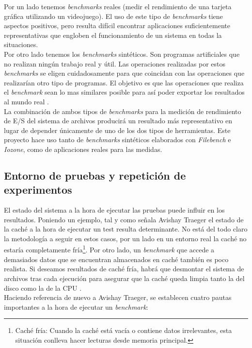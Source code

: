 Por un lado tenemos \textit{benchmarks} reales (medir el rendimiento de una tarjeta gráfica utilizando un videojuego). El uso de este tipo de \textit{benchmarks} tiene aspectos positivos, pero resulta difícil encontrar aplicaciones suficientemente representativas que engloben el funcionamiento de un sistema en todas la situaciones.\\

Por otro lado tenemos los \textit{benchmarks} sintéticos. Son programas artificiales que no realizan ningún trabajo real y útil. Las operaciones realizadas por estos \textit{benchmarks} se eligen cuidadosamente para que coincidan con las operaciones que realizarían otro tipo de programas. El objetivo es que las operaciones que realiza el \textit{benchmark} sean lo mas similares posible para así poder exportar los resultados al mundo real \cite{lilja_2000}.\\

La combinación de ambos tipos de \textit{benchmarks} para la medición de rendimiento de E/S del sistema de archivos producirá un resultado más representativo en lugar de depender únicamente de uno de los dos tipos de herramientas. Este proyecto hace uso tanto de \textit{benchmarks} sintéticos elaborados con \textit{Filebench} e \textit{Iozone}, como de aplicaciones reales para las medidas.

\subsection{Entorno de pruebas y repetición de experimentos}\label{numejecs}
El estado del sistema a la hora de ejecutar las pruebas puede influir en los resultados. Poniendo un ejemplo, tal y como señala Avishay Traeger \cite{traeger} el estado de la caché a la hora de ejecutar un test resulta determinante. No está del todo claro la metodología a seguir en estos casos, por un lado en un entorno real la caché no estaría completamente fría\footnote{Caché fría: Cuando la caché está vacía o contiene datos irrelevantes, esta situación conlleva hacer lecturas desde memoria principal.}. Por otro lado, un \textit{benchmark} que accede a demasiados datos que se encuentran almacenados en caché también es poco realista. Si deseamos resultados de caché fría, habrá que desmontar el sistema de archivos tras cada ejecución para asegurar que la caché queda limpia tanto la del disco como la de la CPU \cite{traeger}.\\

Haciendo referencia de nuevo a Avishay Traeger, se establecen cuatro pautas importantes \cite{traeger} a la hora de ejecutar un \textit{benchmark}: 

